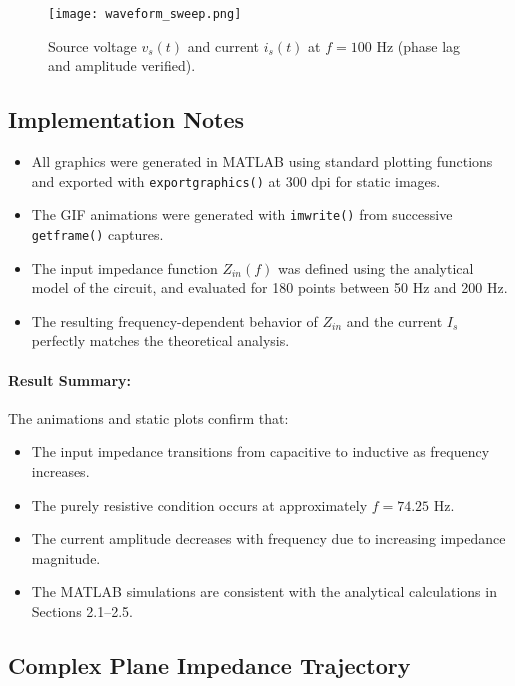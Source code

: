 \documentclass{article}
\begin{document}
\begin{figure}[H]
  \centering
  \texttt{[image: waveform\_sweep.png]}
  \caption{Source voltage $v_s(t)$ and current $i_s(t)$ at $f=100$ Hz (phase lag and amplitude verified).}
\end{figure}

\subsection{Implementation Notes}

\begin{itemize}
  \item All graphics were generated in MATLAB using standard plotting functions and exported with 
  \texttt{exportgraphics()} at 300 dpi for static images.
  \item The GIF animations were generated with \texttt{imwrite()} from successive \texttt{getframe()} captures.
  \item The input impedance function $Z_{in}(f)$ was defined using the analytical model of the circuit,
  and evaluated for 180 points between 50 Hz and 200 Hz.
  \item The resulting frequency-dependent behavior of $Z_{in}$ and the current $I_s$ perfectly matches the 
  theoretical analysis.
\end{itemize}

\paragraph{Result Summary:}
The animations and static plots confirm that:
\begin{itemize}
  \item The input impedance transitions from capacitive to inductive as frequency increases.
  \item The purely resistive condition occurs at approximately $f=74.25$ Hz.
  \item The current amplitude decreases with frequency due to increasing impedance magnitude.
  \item The MATLAB simulations are consistent with the analytical calculations in Sections 2.1–2.5.
\end{itemize}


\subsection{Complex Plane Impedance Trajectory}
\end{document}
